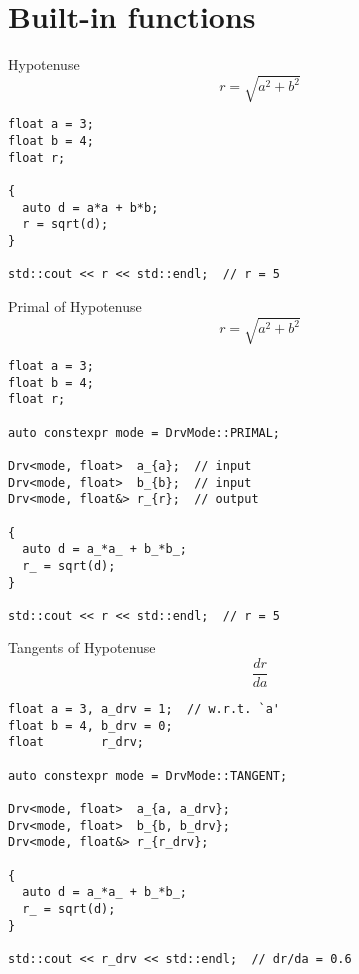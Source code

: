 \documentclass[xcolor=dvipsnames]{beamer}
\begin{document}
\section{Built-in functions}


\begin{frame}[fragile]{Hypotenuse}
\begin{equation*}
  r = \sqrt{a^2 + b^2}
\end{equation*}

\begin{lstlisting}
float a = 3;
float b = 4;
float r;

{
  auto d = a*a + b*b;
  r = sqrt(d);
}

std::cout << r << std::endl;  // r = 5
\end{lstlisting}
\end{frame}


\begin{frame}[fragile]{Primal of Hypotenuse}
\begin{equation*}
  r = \sqrt{a^2 + b^2}
\end{equation*}

\begin{lstlisting}
float a = 3;
float b = 4;
float r;

auto constexpr mode = DrvMode::PRIMAL;

Drv<mode, float>  a_{a};  // input
Drv<mode, float>  b_{b};  // input
Drv<mode, float&> r_{r};  // output

{
  auto d = a_*a_ + b_*b_;
  r_ = sqrt(d);
}

std::cout << r << std::endl;  // r = 5
\end{lstlisting}
\end{frame}


\begin{frame}[fragile]{Tangents of Hypotenuse}
\begin{equation*}
  \frac{d r}{d a}
\end{equation*}

\begin{lstlisting}
float a = 3, a_drv = 1;  // w.r.t. `a'
float b = 4, b_drv = 0;
float        r_drv;

auto constexpr mode = DrvMode::TANGENT;

Drv<mode, float>  a_{a, a_drv};
Drv<mode, float>  b_{b, b_drv};
Drv<mode, float&> r_{r_drv};

{
  auto d = a_*a_ + b_*b_;
  r_ = sqrt(d);
}

std::cout << r_drv << std::endl;  // dr/da = 0.6
\end{lstlisting}
\end{frame}
\end{document}
